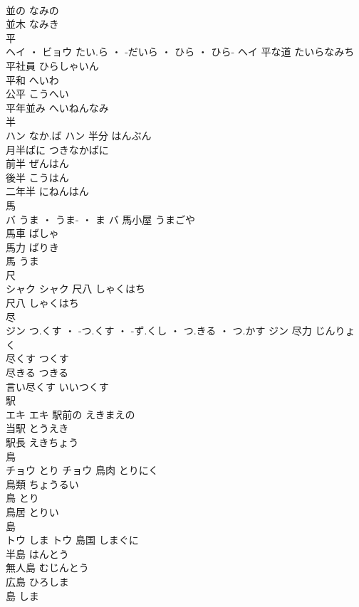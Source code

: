 \documentclass[8pt]{extreport}
\begin{document}
\begin{CJK}{UTF8}{min}
\\	並の	なみの	
\\	並木	なみき	
\\	平	
\\	ヘイ ・ ビョウ	たい.ら ・ -だいら ・ ひら ・ ひら-	ヘイ	平な道	たいらなみち	
\\	平社員	ひらしゃいん	
\\	平和	へいわ	
\\	公平	こうへい	
\\	平年並み	へいねんなみ	
\\	半	
\\	ハン	なか.ば	ハン	半分	はんぶん	
\\	月半ばに	つきなかばに	
\\	前半	ぜんはん	
\\	後半	こうはん	
\\	二年半	にねんはん	
\\	馬	
\\	バ	うま ・ うま- ・ ま	バ	馬小屋	うまごや	
\\	馬車	ばしゃ	
\\	馬力	ばりき	
\\	馬	うま	
\\	尺	
\\	シャク		シャク	尺八	しゃくはち	
\\	尺八	しゃくはち	
\\	尽	
\\	ジン	つ.くす ・ -つ.くす ・ -ず.くし ・ つ.きる ・ つ.かす	ジン	尽力	じんりょく	
\\	尽くす	つくす	
\\	尽きる	つきる	
\\	言い尽くす	いいつくす	
\\	駅	
\\	エキ		エキ	駅前の	えきまえの	
\\	当駅	とうえき	
\\	駅長	えきちょう	
\\	鳥	
\\	チョウ	とり	チョウ	鳥肉	とりにく	
\\	鳥類	ちょうるい	
\\	鳥	とり	
\\	鳥居	とりい	
\\	島	
\\	トウ	しま	トウ	島国	しまぐに	
\\	半島	はんとう	
\\	無人島	むじんとう	
\\	広島	ひろしま	
\\	島	しま	

\end{CJK}
\end{document}
